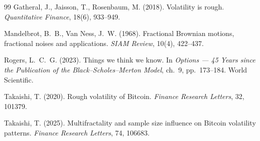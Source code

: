 \documentclass[11pt]{article}
\begin{document}
\begin{thebibliography}{99}
 Gatheral, J., Jaisson, T., Rosenbaum, M. (2018). Volatility is
rough. \emph{Quantitative Finance}, 18(6), 933--949.

 Mandelbrot, B.~B., Van Ness, J.~W. (1968). Fractional Brownian
motions, fractional noises and applications. \emph{SIAM Review}, 10(4), 422--437.

 Rogers, L.~C.~G. (2023). Things we think we know. In
\emph{Options --- 45 Years since the Publication of the Black--Scholes--Merton
Model}, ch.~9, pp.~173--184. World Scientific.

 Takaishi, T. (2020). Rough volatility of Bitcoin.
\emph{Finance Research Letters}, 32, 101379.

 Takaishi, T. (2025). Multifractality and sample size
influence on Bitcoin volatility patterns. \emph{Finance Research Letters}, 74, 106683.

\end{thebibliography}
\end{document}
